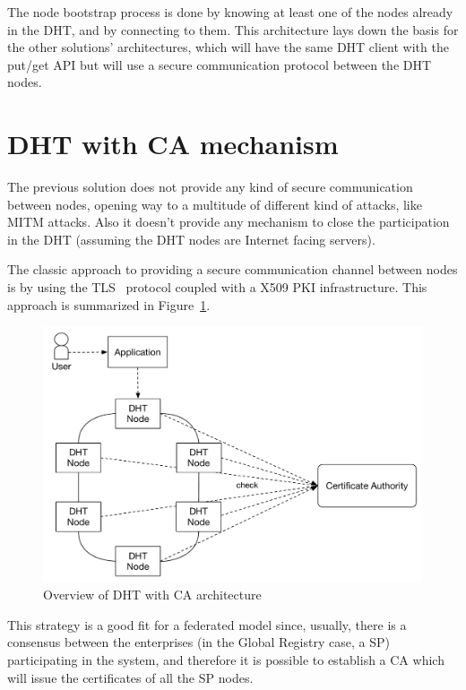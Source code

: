 The node bootstrap process is done by knowing at least one of the nodes already in the DHT, and by connecting to them.
This architecture lays down the basis for the other solutions' architectures, which will have the same DHT client with the put/get API but will use a secure communication protocol between the DHT nodes.

\section{DHT with \ac{CA} mechanism}\label{architecture:ca-overview}

The previous solution does not provide any kind of secure communication between nodes, opening way to a multitude of different kind of attacks, like \ac{MITM} attacks.
Also it doesn't provide any mechanism to close the participation in the \ac{DHT} (assuming the DHT nodes are Internet facing servers).

The classic approach to providing a secure communication channel between nodes is by using the \ac{TLS}~\cite{rfc5246} protocol coupled with a X509 PKI infrastructure.
This approach is summarized in Figure~\ref{fig:architecture-ca-overview}.

\begin{figure}[htb]
  \centering
  \includegraphics[scale=0.5]{Figures/architecture-overview-ca.pdf}
  \caption{Overview of DHT with CA architecture}
\label{fig:architecture-ca-overview}
\end{figure}

This strategy is a good fit for a federated model since, usually, there is a consensus between the enterprises (in the Global Registry case, a \acl{SP}) participating in the system, and therefore it is possible to establish a \ac{CA} which will issue the certificates of all the \ac{SP} nodes.

